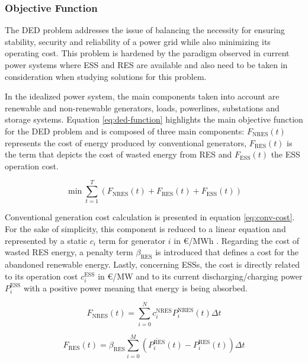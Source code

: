 \subsubsection{Objective Function}

The \ac{DED} problem addresses the issue of balancing the necessity for ensuring stability, security and reliability of a power grid while also minimizing its operating cost. This problem is hardened by the paradigm observed in current power systems where \ac{ESS} and \ac{RES} are available and also need to be taken in consideration when studying solutions for this problem. \par
In the idealized power system, the main components taken into account are renewable and non-renewable generators, loads, powerlines, substations and storage systems.
Equation \ref{eq:ded-function} highlights the main objective function for the \ac{DED} problem and is composed of three main components: $F_\text{NRES}(t)$ represents the cost of energy produced by conventional generators, $F_\text{RES}(t)$ is the term that depicts the cost of wasted energy from \ac{RES} and $F_{\text{ESS}}(t)$ the \ac{ESS} operation cost. \par

\begin{equation} \label{eq:ded-function}
 \min\sum^T_{t=1}(F_\text{NRES}(t) + F_{\text{RES}}(t) + F_{\text{ESS}}(t))
\end{equation}

Conventional generation cost calculation is presented in equation \ref{eq:conv-cost}. For the sake of simplicity, this component is reduced to a linear equation and represented by a static $c_i$ term for generator $i$ in €/MWh . Regarding the cost of wasted \ac{RES} energy, a penalty term $\beta_\text{RES}$ is introduced that defines a cost for the abandoned renewable energy. Lastly, concerning \acp{ESS}, the cost is directly related to its operation cost $c^\text{ESS}_i$ in €/MW and to its current discharging/charging power $P^\text{ESS}_i$ with a positive power meaning that energy is being absorbed.

\begin{equation} \label{eq:conv-cost}
	F_\text{NRES}(t) = \sum^N_{i=0} c^\text{NRES}_i P^\text{NRES}_i(t) \Delta t
\end{equation}

\begin{equation} \label{eq:res-cost}
	F_\text{RES}(t) = \beta_\text{RES} \sum^M_{i=0}  (\overline{P^\text{RES}_i}(t) - P^\text{RES}_i(t)) \Delta t 
\end{equation}

